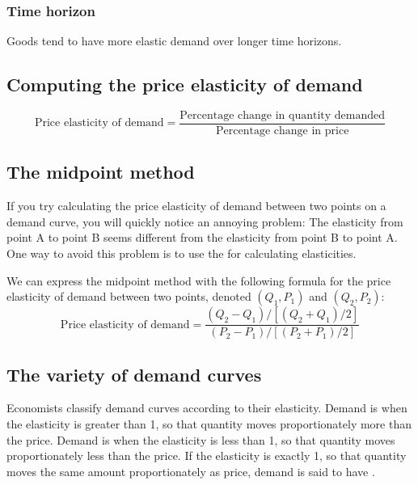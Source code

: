 \subsubsection{Time horizon}

Goods tend to have more elastic demand over longer time horizons.


\subsection{Computing the price elasticity of demand}

\begin{equation}
  \text{Price elasticity of demand} = \frac{\text{Percentage change in quantity demanded}}{\text{Percentage change in price}}
\end{equation}

\subsection{The midpoint method}

If you try calculating the price elasticity of demand between two points on a demand curve, you will quickly notice an annoying problem: The elasticity from point A to point B seems different from the elasticity from point B to point A.
One way to avoid this problem is to use the  for calculating elasticities.



We can express the midpoint method with the following formula for the price elasticity of demand between two points,
denoted $(Q_1, P_1)$ and $(Q_2, P_2)$:
\begin{equation}
  \text{Price elasticity of demand} = \frac{(Q_2-Q_1)/[(Q_2+Q_1)/2]}{(P_2-P_1)/[(P_2+P_1)/2]}
\end{equation}


\subsection{The variety of demand curves}

Economists classify demand curves according to their elasticity.
Demand is  when the elasticity is greater than 1, so that quantity moves proportionately more than the price.
Demand is  when the elasticity is less than 1, so that quantity moves proportionately less than the price.
If the elasticity is exactly 1, so that quantity moves the same amount proportionately as price, demand is said to have .


